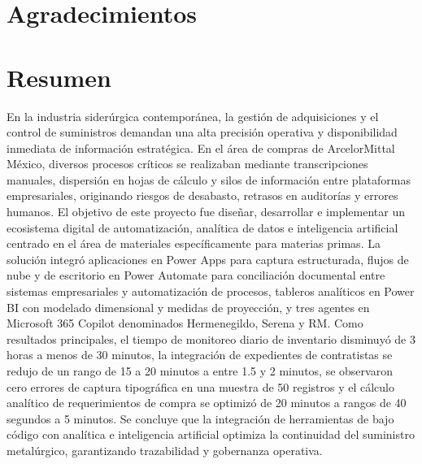 
\clearpage
\ClearWallPaper
\pagestyle{fancy}

\section*{\centering Agradecimientos}


\clearpage
\section*{\centering Resumen} %

En la industria siderúrgica contemporánea, la gestión de adquisiciones y el control de suministros demandan una alta precisión operativa y disponibilidad inmediata de información estratégica.
En el área de compras de ArcelorMittal México, diversos procesos críticos se realizaban mediante transcripciones manuales, 
dispersión en hojas de cálculo y silos de información entre plataformas empresariales, originando riesgos de desabasto, retrasos en auditorías y errores humanos. 
El objetivo de este proyecto fue diseñar, desarrollar e implementar un ecosistema digital de automatización,
analítica de datos e inteligencia artificial centrado en el área de materiales específicamente para materias primas. La solución integró aplicaciones en 
Power Apps para captura estructurada, flujos de nube y de escritorio en Power Automate para conciliación documental 
entre sistemas empresariales y automatización de procesos, tableros analíticos en Power BI con modelado dimensional y medidas de proyección, y tres 
agentes en Microsoft 365 Copilot denominados Hermenegildo, Serena y RM.
Como resultados principales, el tiempo de monitoreo diario de inventario disminuyó de 3 horas a menos de 30 minutos,
la integración de expedientes de contratistas se redujo de un rango de 15 a 20 minutos a entre 1.5 y 2 minutos, se observaron cero errores de captura tipográfica en una muestra de 50 registros y el cálculo analítico de requerimientos de compra se optimizó de 20 minutos a rangos de 40 segundos 
a 5 minutos. Se concluye que la integración de herramientas de bajo código con analítica e inteligencia artificial optimiza la continuidad
del suministro metalúrgico, garantizando trazabilidad y gobernanza operativa.

